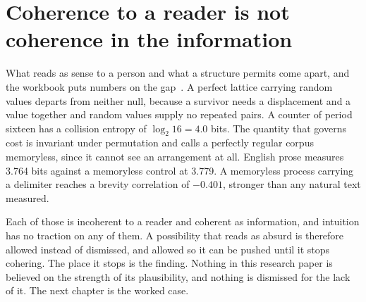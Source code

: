 \section{Coherence to a reader is not coherence in the information}

What reads as sense to a person and what a structure permits come apart, and the workbook puts numbers
on the gap~\cite{src:Quigg-orior-workbook}. A perfect lattice carrying random values departs from
neither null, because a survivor needs a displacement and a value together and random values supply no
repeated pairs. A counter of period sixteen has a collision entropy of \(\log_2 16 = 4.0\) bits. The
quantity that governs cost is invariant under permutation and calls a perfectly regular corpus
memoryless, since it cannot see an arrangement at all. English prose measures 3.764 bits against a
memoryless control at 3.779. A memoryless process carrying a delimiter reaches a brevity correlation
of \(-0.401\), stronger than any natural text measured.

Each of those is incoherent to a reader and coherent as information, and intuition has no traction on
any of them. A possibility that reads as absurd is therefore allowed instead of dismissed, and allowed
so it can be pushed until it stops cohering. The place it stops is the finding. Nothing in this
research paper is believed on the strength of its plausibility, and nothing is dismissed for the lack
of it. The next chapter is the worked case.
